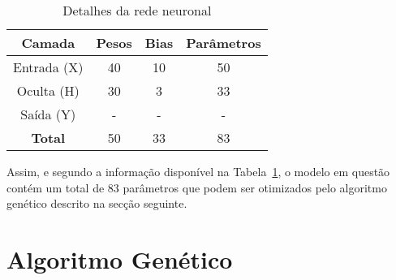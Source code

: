\begin{table}[htpb]
    \centering
    \begin{tabular}{cccc}
        \hline
        \textbf{Camada} & \textbf{Pesos} & \textbf{Bias} & \textbf{Parâmetros} \\ \hline
        Entrada (X)    & 40    & 10   & 50         \\
        Oculta (H)     & 30    & 3    & 33         \\
        Saída (Y)      & -     & -    & -          \\ \hline
        \textbf{Total} & 50    & 33   & 83         \\ \hline
    \end{tabular}
    \caption{Detalhes da rede neuronal}
    \label{tab:nn_summary}
\end{table}

Assim, e segundo a informação disponível na Tabela~\ref{tab:nn_summary}, o modelo em questão contém um total de 83 parâmetros que podem ser otimizados pelo algoritmo genético descrito na secção seguinte.


\section{Algoritmo Genético}\label{sec:gen_alg}
